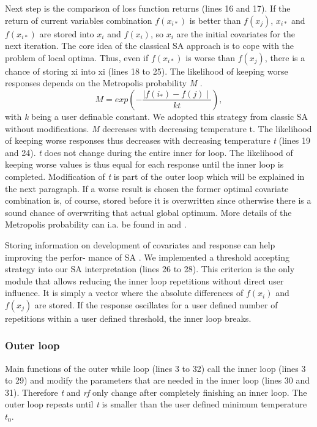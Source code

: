 Next step is the comparison of loss function returns (lines 16 and 17). If the return of current variables combination $f(x_{i*})$ is better than $f(x_j)$, $x_{i*}$ and $f(x_{i*})$ are stored into $x_{i}$ and $f(x_{i})$, so $x_{i}$  are the initial covariates for the next iteration. The core idea of the classical SA approach is to cope with the problem of local optima. Thus, even if $f(x_{i*})$ is worse than $f(x_{j})$, there is a chance of storing xi into xi (lines 18 to 25). The likelihood of keeping worse responses depends on the Metropolis probability \textit{M} \citep{metropolis_1953}.
\begin{equation}
\label{eq:eq1}
M = exp \left(-\frac{\mid f(i_*)-f(j)\mid}{kt}\right),
\end{equation}
with \textit{k} being a user definable constant. We adopted this strategy from classic SA without modifications. \textit{M} decreases with decreasing temperature t. The likelihood of keeping worse responses thus decreases with decreasing temperature \textit{t} (lines 19 and 24). \textit{t} does not change during the entire inner for loop. The likelihood of keeping worse values is thus equal for each response until the inner loop is completed. Modification of \textit{t} is part of the outer loop which will be explained in the next paragraph.  If a worse result is chosen the former optimal covariate combination is, of course, stored before it is overwritten since otherwise there is a sound chance of overwriting that actual global optimum. More details of the Metropolis probability can i.a. be found in \citet{kirkpatrick_1983} and \citet{metropolis_1953}.

Storing information on development of covariates and response can help improving the perfor- mance of SA \citep{lin_1995, hansen_2012}. We implemented a threshold accepting strategy \citep{dueck_1990} into our SA interpretation (lines 26 to 28). This criterion is the only module that allows reducing the inner loop repetitions without direct user influence. It is simply a vector where the absolute differences of $f(x_{i})$ and $f(x_j)$ are stored. If the response oscillates for a user defined number of repetitions within a user defined threshold, the inner loop breaks.

\subsubsection{Outer loop}
Main functions of the outer while loop (lines 3 to 32) call the inner loop (lines 3 to 29) and modify the parameters that are needed in the inner loop (lines 30 and 31). Therefore \textit{t} and \textit{rf} only change after completely finishing an inner loop. The outer loop repeats until \textit{t} is smaller than the user defined minimum temperature $t_0$.

